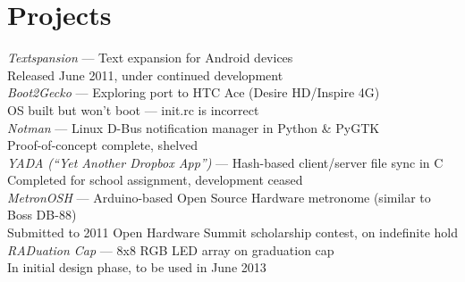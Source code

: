 \documentclass[10pt]{barag_resume}
\begin{document}
	\newpage
	\section{Projects}%
		{\large \emph{Textspansion}} --- Text expansion for Android devices\\{\setlength{\parindent}{1em}
			\indent Released June 2011, under continued development\\
		{\large \emph{Boot2Gecko}} --- Exploring port to HTC Ace (Desire HD/Inspire 4G)\\
			\indent OS built but won't boot --- init.rc is incorrect\\
		{\large \emph{Notman}} --- Linux D-Bus notification manager in Python \& PyGTK\\
			\indent Proof-of-concept complete, shelved\\
		{\large \emph{YADA (``Yet Another Dropbox App'')}} --- Hash-based client/server file sync in C\\
			\indent Completed for school assignment, development ceased\\
		{\large \emph{MetronOSH}} --- Arduino-based Open Source Hardware metronome (similar to Boss DB-88)\\
			\indent Submitted to 2011 Open Hardware Summit scholarship contest, on indefinite hold\\
		{\large \emph{RADuation Cap}} --- 8x8 RGB LED array on graduation cap\\
			\indent In initial design phase, to be used in June 2013}
\end{document}
